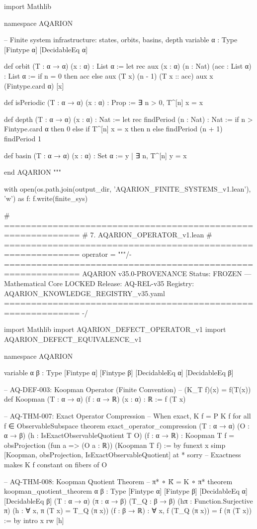 import Mathlib

namespace AQARION

-- Finite system infrastructure: states, orbits, basins, depth
variable {α : Type} [Fintype α] [DecidableEq α]

def orbit (T : α → α) (x : α) : List α :=
  let rec aux (x : α) (n : Nat) (acc : List α) : List α :=
    if n = 0 then acc
    else aux (T x) (n - 1) (T x :: acc)
  aux x (Fintype.card α) [x]

def isPeriodic (T : α → α) (x : α) : Prop :=
  ∃ n > 0, T^[n] x = x

def depth (T : α → α) (x : α) : Nat :=
  let rec findPeriod (n : Nat) : Nat :=
    if n > Fintype.card α then 0
    else if T^[n] x = x then n
    else findPeriod (n + 1)
  findPeriod 1

def basin (T : α → α) (x : α) : Set α :=
  {y | ∃ n, T^[n] y = x}

end AQARION
"""

with open(os.path.join(output_dir, 'AQARION_FINITE_SYSTEMS_v1.lean'), 'w') as f:
    f.write(finite_sys)

# ============================================================
# 7. AQARION_OPERATOR_v1.lean
# ============================================================
operator = """/- ============================================================
   AQARION v35.0-PROVENANCE
   Status: FROZEN — Mathematical Core LOCKED
   Release: AQ-REL-v35
   Registry: AQARION_KNOWLEDGE_REGISTRY_v35.yaml
   ============================================================ -/

import Mathlib
import AQARION_DEFECT_OPERATOR_v1
import AQARION_DEFECT_EQUIVALENCE_v1

namespace AQARION

variable {α β : Type} [Fintype α] [Fintype β] [DecidableEq α] [DecidableEq β]

-- AQ-DEF-003: Koopman Operator (Finite Convention)
-- (K_T f)(x) = f(T(x))
def Koopman (T : α → α) (f : α → ℝ) (x : α) : ℝ :=
  f (T x)

-- AQ-THM-007: Exact Operator Compression
-- When exact, K f = P K f for all f ∈ ObservableSubspace
theorem exact_operator_compression (T : α → α) (O : α → β)
    (h : IsExactObservableQuotient T O) (f : α → ℝ) :
    Koopman T f = obsProjection (fun a => (O a : ℝ)) (Koopman T f) := by
  funext x
  simp [Koopman, obsProjection, IsExactObservableQuotient] at *
  sorry -- Exactness makes K f constant on fibers of O

-- AQ-THM-008: Koopman Quotient Theorem
-- π* ∘ K̃ = K ∘ π*
theorem koopman_quotient_theorem {α β : Type} [Fintype α] [Fintype β] [DecidableEq α] [DecidableEq β]
    (T : α → α) (π : α → β) (T_Q : β → β)
    (hπ : Function.Surjective π)
    (h : ∀ x, π (T x) = T_Q (π x))
    (f : β → ℝ) :
    ∀ x, f (T_Q (π x)) = f (π (T x)) := by
  intro x
  rw [h]

